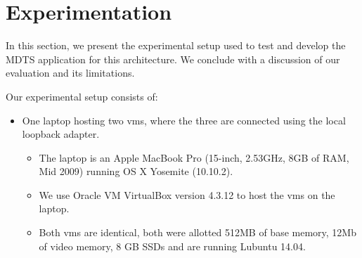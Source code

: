 \documentclass[12pt, titlepage]{uo_temp}
\begin{document}
     \section{Experimentation}
     In this section, we present the experimental setup used to test and develop the MDTS
     application for this architecture. We conclude with a discussion of our evaluation
     and its limitations.

     Our experimental setup consists of:
     \begin{itemize}
     \item One laptop hosting two \gls{vm}s, where the three are connected using the local
       loopback adapter.
     
       \begin{itemize}
       \item The laptop is an Apple MacBook Pro (15-inch, 2.53GHz, 8GB of RAM, Mid 2009) running OS
         X Yosemite (10.10.2).
       \item We use Oracle VM VirtualBox version 4.3.12 to host the \gls{vm}s on the
         laptop.
       \item Both \gls{vm}s are identical, both were allotted 512MB of base memory, 12Mb
         of video memory, 8 GB SSDs and are running Lubuntu 14.04.

       \end{itemize}
     \end{itemize}
\end{document}
